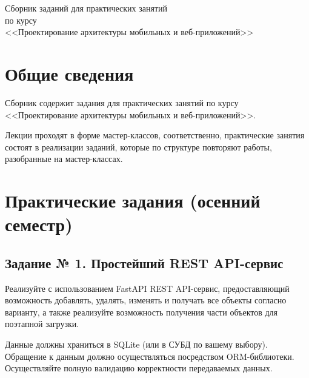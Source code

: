 \documentclass{article}
\begin{document}
{
    \thispagestyle{empty}

    \vspace*{\fill}

    \centering

    \Large
    Сборник заданий для практических занятий \\[12pt]
    по курсу \\[12pt]
    <<Проектирование архитектуры мобильных и веб-приложений>>

    \vspace*{\fill}

    \newpage
}

\tableofcontents

\newpage

\section{Общие сведения}

Сборник содержит задания для практических занятий по курсу
<<Проектирование архитектуры мобильных и веб-приложений>>.

Лекции проходят в форме мастер-классов, соответственно, практические занятия
состоят в реализации заданий, которые по структуре повторяют работы,
разобранные на мастер-классах.

\section{Практические задания (осенний семестр)}

\subsection{Задание № 1. Простейший REST API-сервис}

Реализуйте с использованием FastAPI REST API-сервис, предоставляющий
возможность добавлять, удалять, изменять и получать все объекты согласно
варианту, а также реализуйте возможность получения части объектов для
поэтапной загрузки.

Данные должны храниться в SQLite (или в СУБД по вашему выбору).
Обращение к данным должно осуществляться посредством ORM-библиотеки.
Осуществляйте полную валидацию корректности передаваемых данных.
\end{document}
